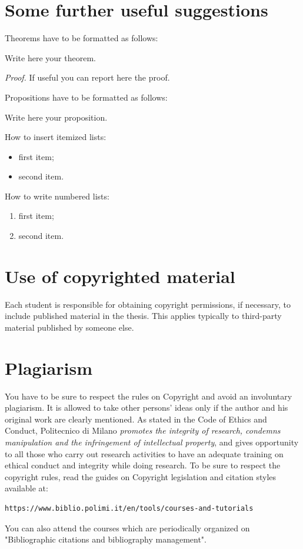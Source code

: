 \documentclass[11pt,a4paper]{article}
\begin{document}
\section{Some further useful suggestions}

Theorems have to be formatted as follows:
\begin{theorem}
    \label{a_theorem}
    Write here your theorem.
\end{theorem}
\textit{Proof.} If useful you can report here the proof.
\vspace{0.3cm} %

Propositions have to be formatted as follows:
\begin{proposition}
    Write here your proposition.
\end{proposition}
\vspace{0.3cm} %

How to insert itemized lists:
\begin{itemize}
    \item first item;
    \item second item.
\end{itemize}
How to write numbered lists:
\begin{enumerate}
    \item first item;
    \item second item.
\end{enumerate}

\section{Use of copyrighted material}

Each student is responsible for obtaining copyright permissions, if necessary, to include published material in the thesis.
This applies typically to third-party material published by someone else.

\section{Plagiarism}

You have to be sure to respect the rules on Copyright and avoid an involuntary plagiarism.
It is allowed to take other persons' ideas only if the author and his original work are clearly mentioned.
As stated in the Code of Ethics and Conduct, Politecnico di Milano \textit{promotes the integrity of research,
    condemns manipulation and the infringement of intellectual property}, and gives opportunity to all those
who carry out research activities to have an adequate training on ethical conduct and integrity while doing research.
To be sure to respect the copyright rules, read the guides on Copyright legislation and citation styles available
at:
\begin{verbatim}
https://www.biblio.polimi.it/en/tools/courses-and-tutorials
\end{verbatim}
You can also attend the courses which are periodically organized on "Bibliographic citations and bibliography management".
\end{document}
